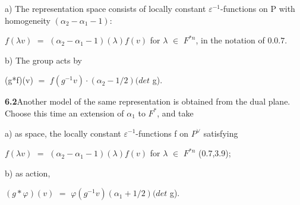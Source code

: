 \documentclass[10pt,a4paper]{article}
\begin{document}
\par a) The representation space consists of locally constant $\varepsilon{}^{-1}$-functions on P with homogeneity $(\alpha{}_2-\alpha{}_1-1)$:\par
\par\smallskip\begin{center}\begin{minipage}{0.96\textwidth}\centering
$f(\lambda{}v)$ $=$ $(\alpha{}_2-\alpha{}_1-1)(\lambda{})f(v)$ for $\lambda{}$ $\in{}$ $F^{*n}$, in the notation of $0.0.7$.
\end{minipage}\end{center}\smallskip
\par b) The group acts by\par
\par\smallskip\begin{center}\begin{minipage}{0.96\textwidth}\centering
(g*f)(v) $=$ $f(g^{-1}v)\cdot{}(\alpha{}_2-1/2)(det$ g).
\end{minipage}\end{center}\smallskip
\par\noindent\textbf{6.2}\quad Another model of the same representation is obtained from the dual plane. Choose this time an extension of $\alpha{}_1$ to $F^*$, and take\par
\par a) as space, the locally constant $\varepsilon{}^{-1}$-functions f on $P^\vee{}$ satisfying\par
\par\smallskip\begin{center}\begin{minipage}{0.96\textwidth}\centering
$f(\lambda{}v)$ $=$ $(\alpha{}_2-\alpha{}_1-1)(\lambda{})f(v)$ for $\lambda{}$ $\in{}$ $F^{*n}$ (0.7,3.9);
\end{minipage}\end{center}\smallskip
\par b) as action,\par
\par\smallskip\begin{center}\begin{minipage}{0.96\textwidth}\centering
$(g*\varphi{})(v)$ $=$ $\varphi{}(g^{-1}v)(\alpha{}_1+1/2)(det$ g).
\end{minipage}\end{center}\smallskip
\end{document}
